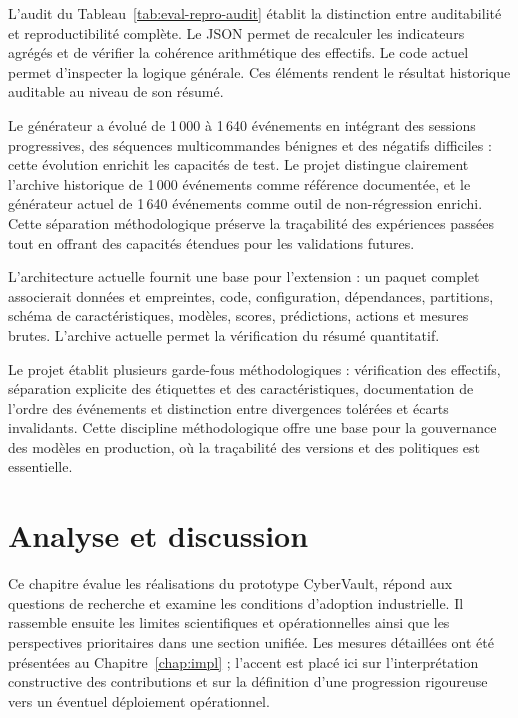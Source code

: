 \documentclass[11pt,a4paper,oneside]{report}
\theoremstyle{definition}
\theoremstyle{plain}
\begin{document}
L'audit du Tableau~\ref{tab:eval-repro-audit} établit la distinction entre
auditabilité et reproductibilité complète. Le JSON permet de recalculer les
indicateurs agrégés et de vérifier la cohérence arithmétique des effectifs. Le
code actuel permet d'inspecter la logique générale. Ces éléments rendent le
résultat historique auditable au niveau de son résumé.

Le générateur a évolué de 1\,000 à 1\,640 événements en intégrant des sessions
progressives, des séquences multicommandes bénignes et des négatifs difficiles
: cette évolution enrichit les capacités de test. Le projet distingue
clairement l'archive historique de 1\,000 événements comme référence
documentée, et le générateur actuel de 1\,640 événements comme outil de
non-régression enrichi. Cette séparation méthodologique préserve la traçabilité
des expériences passées tout en offrant des capacités étendues pour les
validations futures.

L'architecture actuelle fournit une base pour l'extension : un paquet complet
associerait données et empreintes, code, configuration, dépendances,
partitions, schéma de caractéristiques, modèles, scores, prédictions, actions
et mesures brutes. L'archive actuelle permet la vérification du résumé
quantitatif.

Le projet établit plusieurs garde-fous méthodologiques : vérification des
effectifs, séparation explicite des étiquettes et des caractéristiques,
documentation de l'ordre des événements et distinction entre divergences
tolérées et écarts invalidants. Cette discipline méthodologique offre une base
pour la gouvernance des modèles en production, où la traçabilité des versions
et des politiques est essentielle.



\chapter{Analyse et discussion}
\label{chap:discussion}

Ce chapitre évalue les réalisations du prototype CyberVault, répond aux questions de recherche et examine les conditions d'adoption industrielle. Il rassemble ensuite les limites scientifiques et opérationnelles ainsi que les perspectives prioritaires dans une section unifiée. Les mesures détaillées ont été présentées au Chapitre~\ref{chap:impl} ; l'accent est placé ici sur l'interprétation constructive des contributions et sur la définition d'une progression rigoureuse vers un éventuel déploiement opérationnel.
\end{document}
